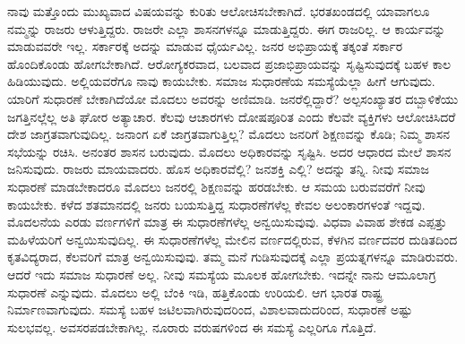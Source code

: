 ನಾವು ಮತ್ತೊಂದು ಮುಖ್ಯವಾದ ವಿಷಯವನ್ನು ಕುರಿತು ಆಲೋಚಿಸಬೇಕಾಗಿದೆ. ಭರತಖಂಡದಲ್ಲಿ ಯಾವಾಗಲೂ ನಮ್ಮನ್ನು ರಾಜರು ಆಳುತ್ತಿದ್ದರು. ರಾಜರೇ ಎಲ್ಲಾ ಶಾಸನಗಳನ್ನೂ ಮಾಡುತ್ತಿದ್ದರು. ಈಗ ರಾಜರಿಲ್ಲ. ಆ ಕಾರ್ಯವನ್ನು ಮಾಡುವವರೇ ಇಲ್ಲ. ಸರ್ಕಾರಕ್ಕೆ ಅದನ್ನು ಮಾಡುವ ಧೈರ್ಯವಿಲ್ಲ. ಜನರ ಅಭಿಪ್ರಾಯಕ್ಕೆ ತಕ್ಕಂತೆ ಸರ್ಕಾರ ಹೊಂದಿಕೊಂಡು ಹೋಗಬೇಕಾಗಿದೆ. ಆರೋಗ್ಯಕರವಾದ, ಬಲವಾದ ಪ್ರಜಾಭಿಪ್ರಾಯವನ್ನು ಸೃಷ್ಟಿಸುವುದಕ್ಕೆ ಬಹಳ ಕಾಲ ಹಿಡಿಯುವುದು. ಅಲ್ಲಿಯವರೆಗೂ ನಾವು ಕಾಯಬೇಕು. ಸಮಾಜ ಸುಧಾರಣೆಯ ಸಮಸ್ಯೆಯೆಲ್ಲಾ ಹೀಗೆ ಆಗುವುದು. ಯಾರಿಗೆ ಸುಧಾರಣೆ ಬೇಕಾಗಿದೆಯೋ ಮೊದಲು ಅವರನ್ನು ಅಣಿಮಾಡಿ. ಜನರೆಲ್ಲಿದ್ದಾರೆ? ಅಲ್ಪಸಂಖ್ಯಾತರ ದಬ್ಬಾಳಿಕೆಯು ಜಗತ್ತಿನಲ್ಲೆಲ್ಲ ಅತಿ ಘೋರ ಅತ್ಯಾಚಾರ. ಕೆಲವು ಆಚಾರಗಳು ದೋಷಪೂರಿತ ಎಂದು ಕೆಲವೇ ವ್ಯಕ್ತಿಗಳು ಆಲೋಚಿಸಿದರೆ ದೇಶ ಜಾಗ್ರತವಾಗುವುದಿಲ್ಲ. ಜನಾಂಗ ಏಕೆ ಜಾಗ್ರತವಾಗುತ್ತಿಲ್ಲ? ಮೊದಲು ಜನರಿಗೆ ಶಿಕ್ಷಣವನ್ನು ಕೊಡಿ; ನಿಮ್ಮ ಶಾಸನ ಸಭೆಯನ್ನು ರಚಿಸಿ. ಅನಂತರ ಶಾಸನ ಬರುವುದು. ಮೊದಲು ಅಧಿಕಾರವನ್ನು ಸೃಷ್ಟಿಸಿ. ಅದರ ಆಧಾರದ ಮೇಲೆ ಶಾಸನ ಜನಿಸುವುದು. ರಾಜರು ಮಾಯವಾದರು. ಹೊಸ ಅಧಿಕಾರವೆಲ್ಲಿ? ಜನಶಕ್ತಿ ಎಲ್ಲಿ? ಅದನ್ನು ತನ್ನಿ. ನೀವು ಸಮಾಜ ಸುಧಾರಣೆ ಮಾಡಬೇಕಾದರೂ ಮೊದಲು ಜನರಲ್ಲಿ ಶಿಕ್ಷಣವನ್ನು ಹರಡಬೇಕು. ಆ ಸಮಯ ಬರುವವರೆಗೆ ನೀವು ಕಾಯಬೇಕು. ಕಳೆದ ಶತಮಾನದಲ್ಲಿ ಜನರು ಬಯಸುತ್ತಿದ್ದ ಸುಧಾರಣೆಗಳೆಲ್ಲ ಕೇವಲ ಅಲಂಕಾರಗಳಂತೆ ಇದ್ದವು. ಮೊದಲನೆಯ ಎರಡು ವರ್ಣಗಳಿಗೆ ಮಾತ್ರ ಈ ಸುಧಾರಣೆಗಳೆಲ್ಲ ಅನ್ವಯಿಸುವುವು. ವಿಧವಾ ವಿವಾಹ ಶೇಕಡ ಎಪ್ಪತ್ತು ಮಹಿಳೆಯರಿಗೆ ಅನ್ವಯಿಸುವುದಿಲ್ಲ. ಈ ಸುಧಾರಣೆಗಳೆಲ್ಲ ಮೇಲಿನ ವರ್ಣದಲ್ಲಿರುವ, ಕೆಳಗಿನ ವರ್ಣದವರ ದುಡಿತದಿಂದ ಕೃತವಿದ್ಯರಾದ, ಕೆಲವರಿಗೆ ಮಾತ್ರ ಅನ್ವಯಿಸುವುವು. ತಮ್ಮ ಮನೆ ಗುಡಿಸುವುದಕ್ಕೆ ಎಲ್ಲಾ ಪ್ರಯತ್ನಗಳನ್ನೂ ಮಾಡಿರುವರು. ಆದರೆ ಇದು ಸಮಾಜ ಸುಧಾರಣೆ ಅಲ್ಲ. ನೀವು ಸಮಸ್ಯೆಯ ಮೂಲಕ ಹೋಗಬೇಕು. ಇದನ್ನೇ ನಾನು ಆಮೂಲಾಗ್ರ ಸುಧಾರಣೆ ಎನ್ನುವುದು. ಮೊದಲು ಅಲ್ಲಿ ಬೆಂಕಿ ಇಡಿ, ಹತ್ತಿಕೊಂಡು ಉರಿಯಲಿ. ಆಗ ಭಾರತ ರಾಷ್ಟ್ರ ನಿರ್ಮಾಣವಾಗುವುದು. ಸಮಸ್ಯೆ ಬಹಳ ಜಟಿಲವಾಗಿರುವುದರಿಂದ, ವಿಶಾಲವಾದುದರಿಂದ, ಸುಧಾರಣೆ ಅಷ್ಟು ಸುಲಭವಲ್ಲ. ಅವಸರಪಡಬೇಕಾಗಿಲ್ಲ. ನೂರಾರು ವರುಷಗಳಿಂದ ಈ ಸಮಸ್ಯೆ ಎಲ್ಲರಿಗೂ ಗೊತ್ತಿದೆ.

